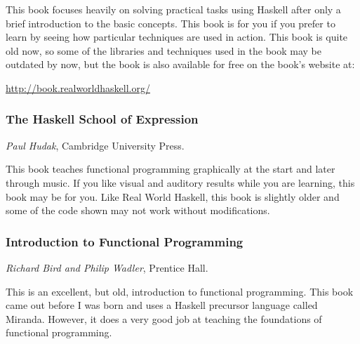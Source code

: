This book focuses heavily on solving practical tasks using Haskell after only a brief introduction to the basic concepts. This book is for you if you prefer to learn by seeing how particular techniques are used in action. This book is quite old now, so some of the libraries and techniques used in the book may be outdated by now, but the book is also available for free on the book's website at:
\begin{center}
	\url{http://book.realworldhaskell.org/}
\end{center} 

\subsubsection{The Haskell School of Expression} \vspace{-0.5cm}
\emph{Paul Hudak}, Cambridge University Press.

This book teaches functional programming graphically at the start and later through music. If you like visual and auditory results while you are learning, this book may be for you. Like Real World Haskell, this book is slightly older and some of the code shown may not work without modifications.

\subsubsection{Introduction to Functional Programming} \vspace{-0.5cm}
\emph{Richard Bird and Philip Wadler}, Prentice Hall.

This is an excellent, but old, introduction to functional programming. This book came out before I was born and uses a Haskell precursor language called Miranda. However, it does a very good job at teaching the foundations of functional programming.